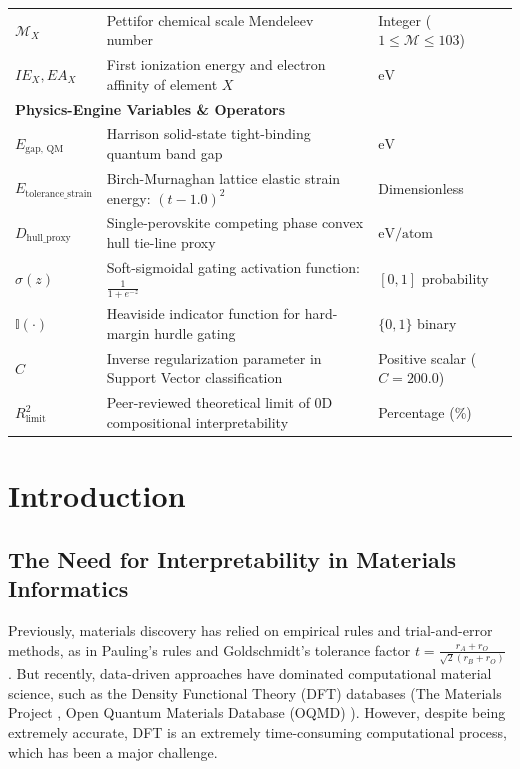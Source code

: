 \documentclass[12pt,onecolumn]{elsarticle}
\begin{document}
\begin{longtable}{l p{} p{}}
$\mathcal{M}_X$ & Pettifor chemical scale Mendeleev number & Integer ($1 \le \mathcal{M} \le 103$) \\
$IE_X, EA_X$ & First ionization energy and electron affinity of element $X$ & $\text{eV}$ \\
\midrule
\multicolumn{3}{l}{\textbf{Physics-Engine Variables \& Operators}} \\
\midrule
$E_{\text{gap, QM}}$ & Harrison solid-state tight-binding quantum band gap & $\text{eV}$ \\
$E_{\text{tolerance\_strain}}$ & Birch-Murnaghan lattice elastic strain energy: $(t - 1.0)^2$ & Dimensionless \\
$D_{\text{hull\_proxy}}$ & Single-perovskite competing phase convex hull tie-line proxy & $\text{eV/atom}$ \\
$\sigma(z)$ & Soft-sigmoidal gating activation function: $\frac{1}{1 + e^{-z}}$ & $[0, 1]$ probability \\
$\mathbb{I}(\cdot)$ & Heaviside indicator function for hard-margin hurdle gating & $\{0, 1\}$ binary \\
$C$ & Inverse regularization parameter in Support Vector classification & Positive scalar ($C=200.0$) \\
$R^2_{\text{limit}}$ & Peer-reviewed theoretical limit of 0D compositional interpretability & Percentage (\%) \\
\end{longtable}

\section{Introduction}

\subsection{The Need for Interpretability in Materials Informatics}
Previously, materials discovery has relied on empirical rules and trial-and-error methods, as in Pauling's rules and Goldschmidt's tolerance factor $t = \frac{r_A + r_O}{\sqrt{2}(r_B + r_O)}$ \cite{goldschmidt1926gesetze, shannon1976revised}. But recently, data-driven approaches have dominated computational material science, such as the Density Functional Theory (DFT) databases (The Materials Project \cite{materialsproject}, Open Quantum Materials Database (OQMD) \cite{kirklin2015open}). However, despite being extremely accurate, DFT is an extremely time-consuming computational process, which has been a major challenge.
\end{document}
